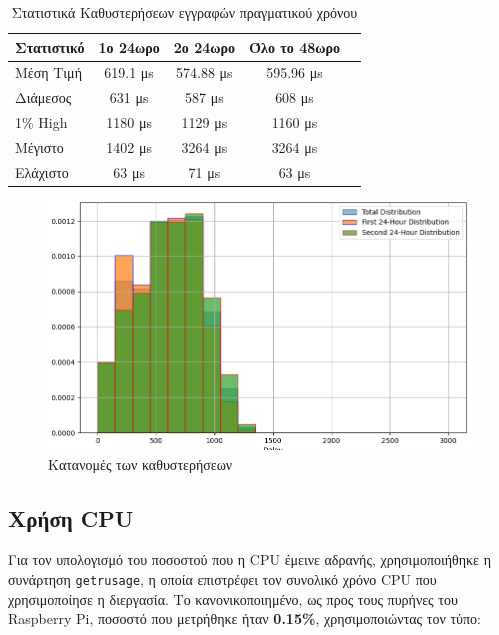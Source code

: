 \documentclass[12pt]{article}
\begin{document}
\begin{table}[H]
    \centering
    \begin{tabular}{lcccc}
        \textbf{Στατιστικό} & \textbf{1ο 24ωρο} & \textbf{2ο 24ωρο} & \textbf{Όλο το 48ωρο}  \\
        \hline
        Μέση Τιμή     & 619.1 μs & 574.88 μs & 595.96 μs    \\
        Διάμεσος  & 631 μs & 587 μs & 608 μs \\
        1\% High & 1180 μs & 1129 μs & 1160 μs  \\
        Μέγιστο      & 1402 μs & 3264 μs & 3264 μs \\
        Ελάχιστο      & 63 μs & 71 μs & 63 μs  \\
    \end{tabular}
    \caption{Στατιστικά Καθυστερήσεων εγγραφών πραγματικού χρόνου}
    \label{tab:realtime_stats}
\end{table}

\begin{figure}[H]
    \centering
    \begin{minipage}{0.8\textwidth}
        \centering
        \includegraphics[width=\linewidth]{statistics.png} %
        \caption{Κατανομές των καθυστερήσεων}
        \label{fig:stats}
    \end{minipage}
\end{figure}

\subsection{Χρήση CPU}

Για τον υπολογισμό του ποσοστού που η CPU έμεινε αδρανής, χρησιμοποιήθηκε η συνάρτηση \texttt{getrusage}, η οποία επιστρέφει τον συνολικό χρόνο CPU που χρησιμοποίησε η διεργασία. Το κανονικοποιημένο, ως προς τους πυρήνες του Raspberry Pi, ποσοστό που μετρήθηκε ήταν \textbf{0.15\%}, χρησιμοποιώντας τον τύπο:
\end{document}
